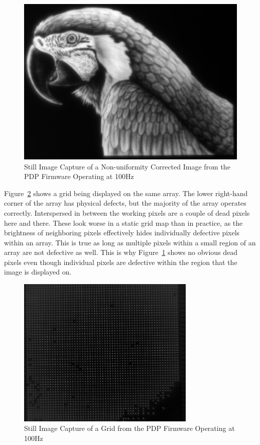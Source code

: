             \begin{figure}[t]
                \centering
                \includegraphics{fig/pdp_bird.png}
                \caption{Still Image Capture of a Non-uniformity Corrected Image from the PDP Firmware Operating at 100Hz}
                \label{fig:pdp_bird}
            \end{figure}

            Figure~\ref{fig:pdp_grid} shows a grid being displayed on the same array. The lower right-hand corner of the array has physical defects, but the majority of the array operates correctly. Interspersed in between the working pixels are a couple of dead pixels here and there. These look worse in a static grid map than in practice, as the brightness of neighboring pixels effectively hides individually defective pixels within an array. This is true as long as multiple pixels within a small region of an array are not defective as well. This is why Figure~\ref{fig:pdp_bird} shows no obvious dead pixels even though individual pixels are defective within the region that the image is displayed on.

            \begin{figure}[t]
                \centering
                \includegraphics[width=0.76\textwidth]{fig/pdp_grid.png}
                \caption{Still Image Capture of a Grid from the PDP Firmware Operating at 100Hz}
                \label{fig:pdp_grid}
            \end{figure}


